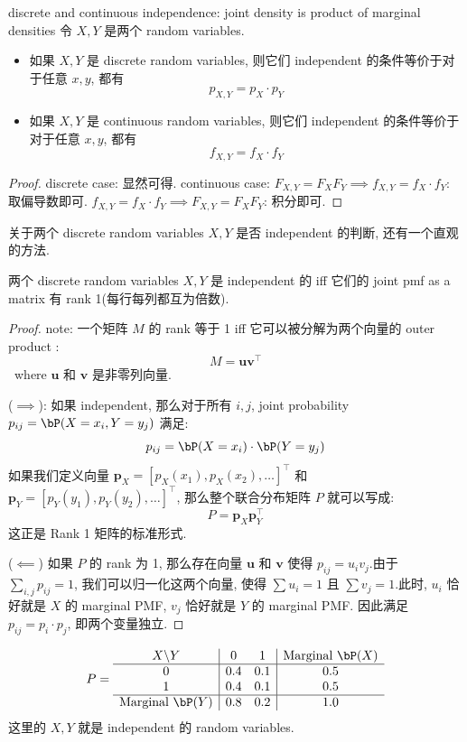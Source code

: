 \begin{theorem}{discrete and continuous independence: joint density is product of marginal densities} \label{discrete and continuous case of independence: joint density is product of marginal densities}
    令 \(X, Y\) 是两个 random variables. 
    \begin{itemize}
        \item 如果 \(X, Y\) 是 discrete random variables, 
        则它们 independent 的条件等价于对于任意 \(x, y\), 都有
        \[
        p_{X,Y} = p_X \cdot p_Y
        \]
        \item 如果 \(X, Y\) 是 continuous random variables, 则它们 independent 的条件等价于对于任意 \(x, y\), 都有
        \[
        f_{X,Y} = f_X \cdot f_Y
        \]
    \end{itemize}
\end{theorem}
\begin{proof}
    discrete case: 显然可得.
    continuous case: 
    \(F_{X,Y} = F_X F_Y  \implies f_{X,Y} = f_X \cdot f_Y\): 取偏导数即可.
    \(f_{X,Y} = f_X \cdot f_Y \implies F_{X,Y} = F_X F_Y\): 积分即可.
\end{proof}

\begin{remark}
关于两个 discrete random variables \(X, Y\) 是否 independent 的判断,
还有一个直观的方法.
\begin{proposition}
    两个 discrete random variables \(X, Y\) 
    是 independent 的 iff 它们的 joint pmf as a matrix 
    有 rank 1(每行每列都互为倍数).
\end{proposition}
\begin{proof}
note: 一个矩阵 $M$ 的 rank 等于 1 iff 它可以被分解为两个向量的 outer product
:$$M = \mathbf{u}\mathbf{v}^\top$$\
where $\mathbf{u}$ 和 $\mathbf{v}$ 是非零列向量.

($\implies$): 如果 independent, 
那么对于所有 $i, j$,
joint probability $p_{ij} = \bP(X=x_i, Y=y_j)$ 
满足:$$p_{ij} = \bP(X=x_i) \cdot \bP(Y=y_j)$$
如果我们定义向量 $\mathbf{p}_X = [p_X(x_1), p_X(x_2), \dots]^\top$ 
和 $\mathbf{p}_Y = [p_Y(y_1), p_Y(y_2), \dots]^\top$, 
那么整个联合分布矩阵 $P$ 就可以写成:$$P = \mathbf{p}_X \mathbf{p}_Y^\top$$
这正是 Rank 1 矩阵的标准形式. 

($\impliedby$) 
如果 $P$ 的 rank 为 1, 
那么存在向量 $\mathbf{u}$ 和 $\mathbf{v}$ 
使得 $p_{ij} = u_i v_j$.由于 $\sum_{i,j} p_{ij} = 1$, 
我们可以归一化这两个向量, 使得 $\sum u_i = 1$ 
且 $\sum v_j = 1$.此时, $u_i$ 恰好就是 $X$ 的 marginal PMF, 
$v_j$ 恰好就是 $Y$ 的 marginal PMF. 因此满足 $p_{ij} = p_i \cdot p_j$, 即两个变量独立.
\end{proof}
\begin{example}
    \[
    P = 
    \begin{array}{c|cc|c}
    X \backslash Y & 0 & 1 & \text{Marginal } \bP(X) \\ \hline
    0 & 0.4 & 0.1 & 0.5 \\
    1 & 0.4 & 0.1 & 0.5 \\ \hline
    \text{Marginal } \bP(Y) & 0.8 & 0.2 & 1.0
    \end{array}
    \]
这里的 \(X,Y\) 就是 independent 的 random variables.
\end{example}
\end{remark}


